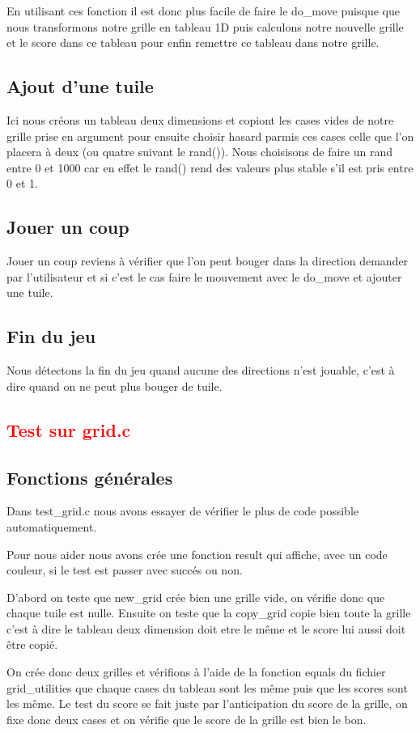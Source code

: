 \documentclass{article}
\begin{document}
En utilisant ces fonction il est donc plus facile de faire le do\_move puisque que nous transformons notre grille en tableau 1D puis calculons notre nouvelle grille et le score dans ce tableau pour enfin remettre ce tableau dans notre grille.
\subsection{Ajout d'une tuile}
Ici nous créons un tableau deux dimensions et copiont les cases vides de notre grille prise en argument pour ensuite choisir hasard parmis ces cases celle que l'on placera à deux (ou quatre suivant le rand()). Nous choisisons de faire un rand entre 0 et 1000 car en effet le rand() rend des valeurs plus stable s'il est pris entre 0 et 1.
\subsection{Jouer un coup}
Jouer un coup reviens à vérifier que l'on peut bouger dans la direction demander par l'utilisateur et si c'est le cas faire le mouvement avec le do\_move et ajouter une tuile.
\subsection{Fin du jeu}
Nous détectons la fin du jeu quand aucune des directions n'est jouable, c'est à dire quand on ne peut plus bouger de tuile.
\textcolor{red}{\section{Test sur grid.c}}


  \subsection{Fonctions générales}
  Dans test\_grid.c nous avons essayer de vérifier le plus de code possible automatiquement.
  
  Pour nous aider nous avons crée une fonction result qui affiche, avec un code couleur, si le test est passer avec succés ou non.
  
  D'abord on teste que new\_grid crée bien une grille vide, on vérifie donc que chaque tuile est nulle.
  Ensuite on teste que la copy\_grid copie bien toute la grille c'est à dire le tableau deux dimension doit etre le même et le score lui aussi doit être copié.

  On crée donc deux grilles et vérifions à l'aide de la fonction equals du fichier grid\_utilities que chaque cases du tableau sont les même puis que les scores sont les même.
  Le test du score se fait juste par l'anticipation du score de la grille, on fixe donc deux cases et on vérifie que le score de la grille est bien le bon.
\end{document}
